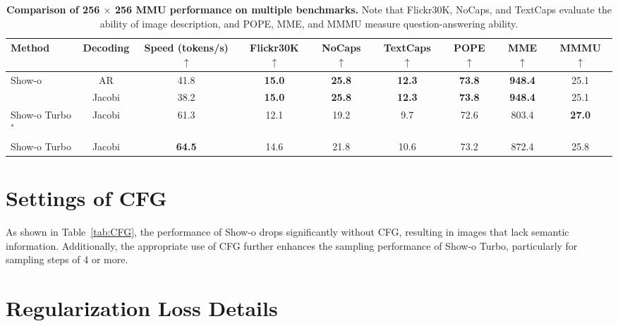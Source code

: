 \begin{table*}[htbp]
    \centering
    \setlength{\tabcolsep}{3pt}
    \begin{threeparttable}
        \begin{tabular}{lc|c|ccc|ccc}
            \toprule
            \textbf{Method} & \textbf{Decoding}  & \textbf{Speed (tokens/s) \large$\uparrow$} & \textbf{Flickr30K \large$\uparrow$}  &\textbf{NoCaps \large$\uparrow$} &\textbf{TextCaps \large$\uparrow$} & \textbf{POPE \large$\uparrow$} & \textbf{MME \large$\uparrow$}  & \textbf{MMMU \large$\uparrow$} \\
            \midrule
            \multirow{2}{*}{Show-o} & AR &  41.8 & \textbf{15.0} & \textbf{25.8} & \textbf{12.3} & \textbf{73.8} & \textbf{948.4}  & 25.1 \\
            & Jacobi &  38.2 & \textbf{15.0} & \textbf{25.8} & \textbf{12.3} & \textbf{73.8} & \textbf{948.4} & 25.1 \\
            \midrule
            Show-o Turbo$^{*}$ & Jacobi &  61.3 & 12.1 & 19.2 & 9.7 & 72.6 & 803.4 & \textbf{27.0} \\
            Show-o Turbo & Jacobi & \textbf{64.5} & 14.6 & 21.8 & 10.6 & 73.2 & 872.4 & 25.8 \\
            \bottomrule
        \end{tabular}
    \end{threeparttable}%
    \caption{\textbf{Comparison of 256 $\times$ 256 MMU performance on multiple benchmarks.} 
    Note that Flickr30K, NoCaps, and TextCaps evaluate the ability of image description, and POPE, MME, and MMMU measure question-answering ability.}
    \label{tab:old_speed_comparison}
\end{table*}

\section{Settings of CFG}
\label{sec:cfg_appendix}
As shown in Table~\ref{tab:CFG}, the performance of Show-o drops significantly without CFG, resulting in images that lack semantic information. Additionally, the appropriate use of CFG further enhances the sampling performance of Show-o Turbo, particularly for sampling steps of 4 or more.




\section{Regularization Loss Details}

